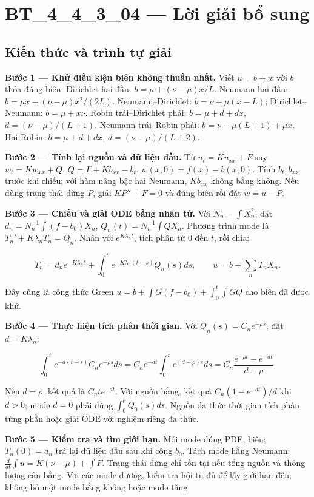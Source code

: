 \documentclass[10pt,a4paper]{article}
\begin{document}
\section*{BT\_4\_4\_3\_04 — Lời giải bổ sung}
\subsection*{Kiến thức và trình tự giải}
\textbf{Bước 1 — Khử điều kiện biên không thuần nhất.} Viết $u=b+w$ với $b$ thỏa đúng biên. Dirichlet hai đầu: $b=\mu+(\nu-\mu)x/L$. Neumann hai đầu: $b=\mu x+(\nu-\mu)x^2/(2L)$. Neumann–Dirichlet: $b=\nu+\mu(x-L)$; Dirichlet–Neumann: $b=\mu+x\nu$. Robin trái–Dirichlet phải: $b=\mu+d+dx$, $d=(\nu-\mu)/(L+1)$. Neumann trái–Robin phải: $b=\nu-\mu(L+1)+\mu x$. Hai Robin: $b=\mu+d+dx$, $d=(\nu-\mu)/(L+2)$.

\textbf{Bước 2 — Tính lại nguồn và dữ liệu đầu.} Từ $u_t=Ku_{xx}+F$ suy $w_t=Kw_{xx}+Q$, $Q=F+Kb_{xx}-b_t$, $w(x,0)=f(x)-b(x,0)$. Tính $b_t,b_{xx}$ trước khi chiếu; với hàm nâng bậc hai Neumann, $Kb_{xx}$ không bằng không. Nếu dùng trạng thái dừng $P$, giải $KP''+F=0$ và đúng biên rồi đặt $w=u-P$.

\textbf{Bước 3 — Chiếu và giải ODE bằng nhân tử.} Với $N_n=\int X_n^2$, đặt $d_n=N_n^{-1}\int(f-b_0)X_n$, $Q_n(t)=N_n^{-1}\int QX_n$. Phương trình mode là $T_n'+K\lambda_nT_n=Q_n$. Nhân với $e^{K\lambda_nt}$, tích phân từ $0$ đến $t$, rồi chia:


\[
T_n=d_ne^{-K\lambda_nt}+\int_0^te^{-K\lambda_n(t-s)}Q_n(s)ds,\qquad
u=b+\sum_nT_nX_n.
\]


Đây cũng là công thức Green $u=b+\int G(f-b_0)+\int_0^t\int GQ$ cho biên đã được khử.

\textbf{Bước 4 — Thực hiện tích phân thời gian.} Với $Q_n(s)=C_ne^{-\rho s}$, đặt $d=K\lambda_n$:


\[
\int_0^te^{-d(t-s)}C_ne^{-\rho s}ds
=C_ne^{-dt}\int_0^te^{(d-\rho)s}ds
=C_n\frac{e^{-\rho t}-e^{-dt}}{d-\rho}.
\]


Nếu $d=\rho$, kết quả là $C_nte^{-dt}$. Với nguồn hằng, kết quả $C_n(1-e^{-dt})/d$ khi $d>0$; mode $d=0$ phải dùng $\int_0^tQ_0(s)ds$. Nguồn đa thức thời gian tích phân từng phần hoặc giải ODE với nghiệm riêng đa thức.

\textbf{Bước 5 — Kiểm tra và tìm giới hạn.} Mỗi mode đúng PDE, biên; $T_n(0)=d_n$ trả lại dữ liệu đầu sau khi cộng $b_0$. Tách mode hằng Neumann: $\frac d{dt}\int u=K(\nu-\mu)+\int F$. Trạng thái dừng chỉ tồn tại nếu tổng nguồn và thông lượng cân bằng. Với các mode dương, kiểm tra hội tụ đủ để lấy giới hạn đều; không bỏ một mode bằng không hoặc mode tăng.
\end{document}

